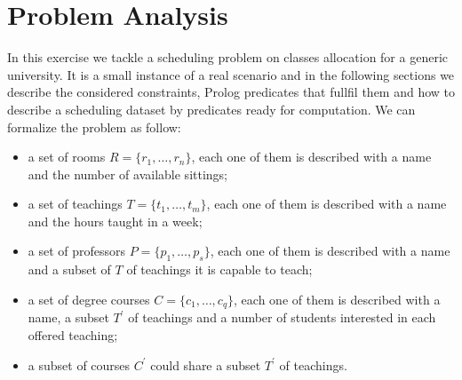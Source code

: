 \documentclass[10pt,a4paper]{article} %
\begin{document}
    \title{\rmfamily\normalfont{}}
    \author{}
    \date{\today}

    \maketitle

    \begin{abstract}
        This short document explains my work to support
        AI exam, taught by Prof. Paolo Frasconi at University of Florence,
        comments some results and shows how to reproduce test cases.
        I implemented a Prolog program that produce a schedule for the
        problem at hand, satisfying the requested constraints.
    \end{abstract}

    \tableofcontents

    \section{Problem Analysis}
    In this exercise we tackle a scheduling problem on classes allocation
    for a generic university. It is a small instance of a real scenario
    and in the following sections we describe the considered constraints,
    Prolog predicates that fullfil them and how to describe a scheduling
    dataset by predicates ready for computation.
    We can formalize the problem as follow:
    \begin{itemize}
        \item a set of rooms $R = \lbrace r_1, \ldots, r_n \rbrace$, each
            one of them is described with a name and the number
            of available sittings;
        \item a set of teachings $T = \lbrace t_1, \ldots, t_m \rbrace$, each
            one of them is described with a name and the hours taught in a week;
        \item a set of professors $P = \lbrace p_1, \ldots, p_s \rbrace$, each
            one of them is described with a name and a subset of $T$ of teachings
            it is capable to teach;
        \item a set of degree courses $C = \lbrace c_1, \ldots, c_q \rbrace$, each
            one of them is described with a name, a subset $T^\prime$ of teachings
            and a number of students interested in each offered teaching;
        \item a subset of courses $C^\prime$ could share a subset $T^\prime$ of teachings.
    \end{itemize}
\end{document}
